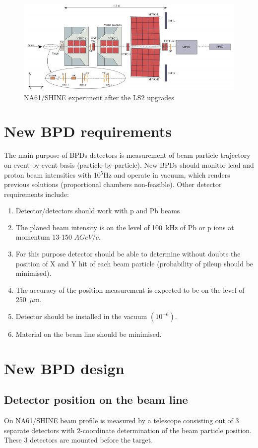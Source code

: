 \documentclass[a4paper]{jpconf}
\begin{document}
\begin{figure}[htbp]
	\centering
	\includegraphics[width=.7\textwidth]{NA61_scheme.png}
	\caption{\label{fig:1} NA61/SHINE experiment after the LS2 upgrades}
\end{figure}

\section{New BPD requirements}
The main purpose of BPDs detectors is measurement of beam particle trajectory on event-by-event basis (particle-by-particle). New BPDs should monitor lead and proton beam intensities with 10$^5$Hz and operate in vacuum, which renders previous solutions (proportional chambers non-feasible). Other detector requirements include:
\begin{enumerate}
	\item Detector/detectors should work with p and Pb beams
	\item The planed beam intensity is on the level of 100~kHz of Pb or p ions at momentum 13-150 $AGeV/c$.
	\item For this purpose detector should be able to determine without doubts the position of X and Y hit of each beam particle (probability of pileup should be minimised).
	\item The accuracy of the position measurement is expected to be on the level of 250~$\mu$m.
	\item Detector should be installed in the vacuum $\left(10^{-6}\right)$.
	\item Material on the beam line should be minimised.
\end{enumerate}

\section{New BPD design}

\subsection{Detector position on the beam line}
On NA61/SHINE beam profile is measured by a telescope consisting out of 3 separate detectors with 2-coordinate determination of the beam particle position. These 3 detectors are mounted before the target.
\end{document}
